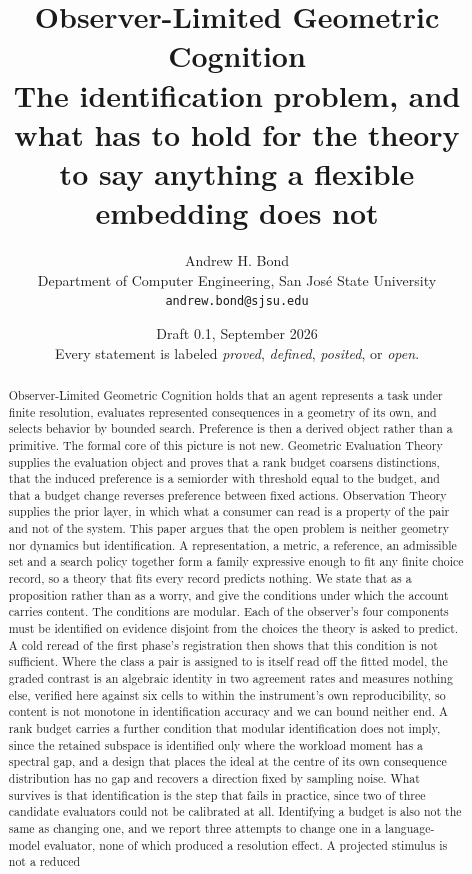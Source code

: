 \documentclass[11pt,letterpaper]{article}
\title{\vspace{-1.2cm}\textbf{Observer-Limited Geometric Cognition}\\[0.5em]
\large The identification problem, and what has to hold for the theory\\
to say anything a flexible embedding does not}
\author{Andrew H. Bond\\
\small Department of Computer Engineering, San Jos\'e State University\\
\small \texttt{andrew.bond@sjsu.edu}}
\date{\small Draft 0.1, September 2026\\[0.4em]
\small Every statement is labeled \emph{proved}, \emph{defined}, \emph{posited},
or \emph{open}.}
\theoremstyle{plain}
\theoremstyle{definition}
\begin{document}
\maketitle

\begin{abstract}
\noindent
Observer-Limited Geometric Cognition holds that an agent represents a task under
finite resolution, evaluates represented consequences in a geometry of its own,
and selects behavior by bounded search. Preference is then a derived object
rather than a primitive. The formal core of this picture is not new. Geometric
Evaluation Theory supplies the evaluation object and proves that a rank budget
coarsens distinctions, that the induced preference is a semiorder with threshold
equal to the budget, and that a budget change reverses preference between fixed
actions. Observation Theory supplies the prior layer, in which what a consumer
can read is a property of the pair and not of the system. This paper argues that
the open problem is neither geometry nor dynamics but identification. A
representation, a metric, a reference, an admissible set and a search policy
together form a family expressive enough to fit any finite choice record, so a
theory that fits every record predicts nothing. We state that as a proposition
rather than as a worry, and give the conditions under which the account
carries content. The conditions are modular. Each of the observer's four
components must be identified on evidence disjoint from the choices the theory
is asked to predict. A cold reread of the first phase's registration
then shows that this condition is not sufficient. Where the class a pair is
assigned to is itself read off the fitted model, the graded contrast is an
algebraic identity in two agreement rates and measures nothing else, verified
here against six cells to within the instrument's own reproducibility, so
content is not monotone in identification accuracy and we can bound neither end.
A rank budget carries a further condition that modular identification does not
imply, since the retained subspace is identified only where the workload moment
has a spectral gap, and a design that places the ideal at the centre of its own
consequence distribution has no gap and recovers a direction fixed by sampling
noise. What survives is that identification is the step
that fails in practice, since two of three candidate evaluators could not be
calibrated at all. Identifying a budget is also not the same as changing one,
and we report three attempts to change one in a language-model evaluator, none
of which produced a resolution effect. A projected stimulus is not a reduced

\end{abstract}
\end{document}
